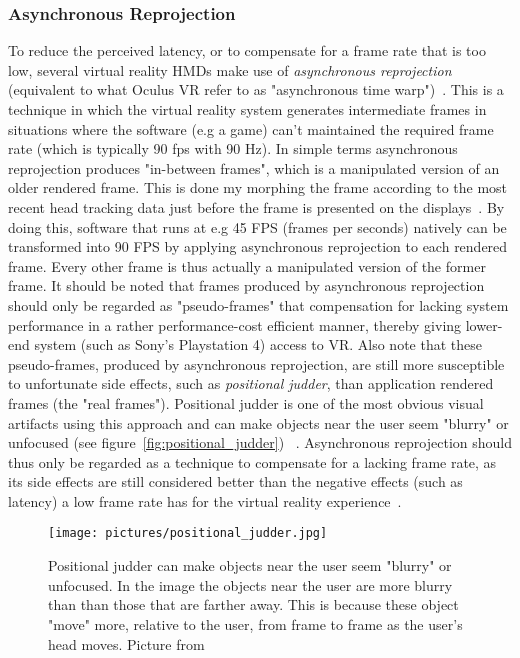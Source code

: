 \subsubsection{Asynchronous Reprojection}
To reduce the perceived latency, or to compensate for a frame rate that is too low, several virtual reality HMDs make use of \textit{asynchronous reprojection}
(equivalent to what Oculus VR refer to as "asynchronous time warp")~\citep{GD2016}. This is a technique in which the virtual reality system generates intermediate frames 
in situations where the software (e.g a game) can't maintained the required frame rate (which is typically 90 fps with 90 Hz). In simple terms asynchronous reprojection 
produces "in-between frames", which is a manipulated version of an older rendered frame. This is done my morphing the frame according to the most recent head tracking data just 
before the frame is presented on the displays~\citep{GD2016}. By doing this, software that runs at e.g 45 FPS (frames per seconds) natively can be transformed into 90 FPS by 
applying asynchronous reprojection to each rendered frame. Every other frame is thus actually a manipulated version of the former frame. It should be noted that frames produced by
asynchronous reprojection should only be regarded as "pseudo-frames" that compensation for lacking system performance in a rather performance-cost efficient manner, thereby
giving lower-end system (such as Sony's Playstation 4) access to VR. Also note that these pseudo-frames, produced by asynchronous reprojection, are still 
more susceptible to unfortunate side effects, such as \textit{positional judder}, than application rendered frames (the "real frames"). Positional judder is
one of the most obvious visual artifacts using this approach and can make objects near the user seem "blurry" or unfocused (see figure~\vref{fig:positional_judder})
~\citep{Antonov2015}. Asynchronous reprojection should thus only be regarded as a technique to compensate for a lacking frame rate, as its side effects are 
still considered better than the negative effects (such as latency) a low frame rate has for the virtual reality experience~\citep{OCULUS2016}. 

\begin{figure}%
	\label{fig:positional_judder}
	\texttt{[image: pictures/positional\_judder.jpg]}
	\caption[Positional judder can make objects near the user seem "blurry" or unfocused]
	{Positional judder can make objects near the user seem "blurry" or unfocused. In the image the objects near the user are more blurry than 
	than those that are farther away. This is because these object "move" more, relative to the user, from frame to frame as the user's head moves. 
	Picture from~\citet{Antonov2015}}
\end{figure} 



